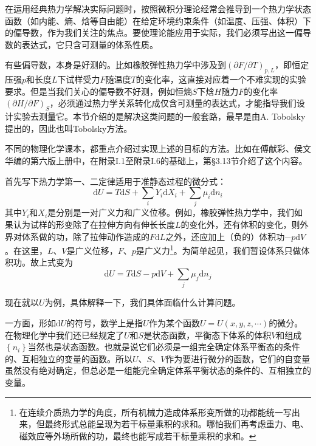 \documentclass[main.tex]{subfiles}
\begin{document}
在运用经典热力学解决实际问题时，按照微积分理论经常会推导到一个热力学状态函数（如内能、熵、焓等自由能）在给定环境约束条件（如温度、压强、体积）下的偏导数，作为我们关注的焦点。要使理论能应用于实际，我们必须写出这一偏导数的表达式，它只含可测量的体系性质。

有些偏导数，本身是好测的。比如橡胶弹性热力学中涉及到$\left(\partial F/\partial T\right)_{p,L}$，即恒定压强$p$和长度$L$下试样受力$F$随温度$T$的变化率，这直接对应着一个不难实现的实验要求。但是当我们关心的偏导数不好测，例如恒熵$S$下焓$H$随力$F$的变化率$\left(\partial H/\partial F\right)_{S}$，必须通过热力学关系转化成仅含可测量的表达式，才能指导我们设计实验去测量它。本节介绍的是解决这类问题的一般套路，最早是由A. Tobolsky提出的，因此也叫Tobolsky方法。

不同的物理化学课本，都重点介绍过实现上述的目标的方法。比如在傅献彩、侯文华编的第六版上册\cite{傅献彩2022I}中，在附录I.1至附录I.6的基础上，第\S 3.13节介绍了这个内容。

首先写下热力学第一、二定律适用于准静态过程的微分式：
\[\mathrm{d}U=T\mathrm{d}S+\sum_iY_i\mathrm{d}X_i+\sum_j\mu_i\mathrm{d}n_i\]
其中$Y_i$和$X_i$是分别是一对广义力和广义位移。例如，橡胶弹性热力学中，我们如果认为试样的形变除了在拉伸方向有伸长长度$L$的变化外，还有体积的变化，则外界对体系做的功，除了拉伸动作造成的$F\mathrm{d}L$之外，还应加上（负的）体积功$-p\mathrm{d}V$。在这里，$L$、$V$是广义位移，$F$、$p$是广义力\footnote{在连续介质热力学的角度，所有机械力造成体系形变所做的功都能统一写出来，但最终形式总能呈现为若干标量乘积的求和。哪怕我们再考虑重力、电、磁效应等外场所做的功，最终也能写成若干标量乘积的求和。}。为简单起见，我们暂设体系只做体积功。故上式变为
\begin{equation}\label{eq:A.II.1_first_second_law}
    \mathrm{d}U=T\mathrm{d}S-p\mathrm{d}V+\sum_j\mu_j\mathrm{d}n_j
\end{equation}

现在就以$U$为例，具体解释一下，我们具体面临什么计算问题。

一方面，形如$\mathrm{d}U$的符号，数学上是指$U$作为某个函数$U=U\left(x,y,z,\cdots\right)$的微分。在物理化学中我们还已经规定了$U$和$S$是状态函数，平衡态下体系的体积$V$和组成$\left\{n_i\right\}$当然也是状态函数。也就是说它们必须是一组完全确定体系平衡态的条件的、互相独立的变量的函数。所以$U$、$S$、$V$作为要进行微分的函数，它们的自变量虽然没有绝对确定，但总必是一组能完全确定体系平衡状态的条件的、互相独立的变量。
\end{document}

